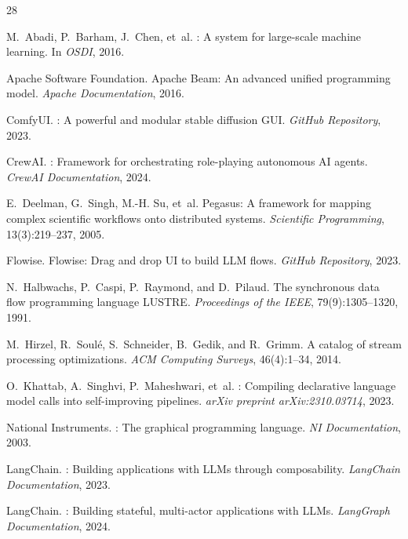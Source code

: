 \documentclass[11pt,twocolumn]{article}
\begin{document}

\begin{thebibliography}{28}

M.~Abadi, P.~Barham, J.~Chen, et~al.
: A system for large-scale machine learning.
\newblock In \emph{OSDI}, 2016.

Apache Software Foundation.
\newblock Apache {Beam}: An advanced unified programming model.
\newblock \emph{Apache Documentation}, 2016.

ComfyUI.
: A powerful and modular stable diffusion {GUI}.
\newblock \emph{GitHub Repository}, 2023.

CrewAI.
: Framework for orchestrating role-playing autonomous {AI} agents.
\newblock \emph{CrewAI Documentation}, 2024.

E.~Deelman, G.~Singh, M.-H. Su, et~al.
\newblock Pegasus: A framework for mapping complex scientific workflows onto distributed systems.
\newblock \emph{Scientific Programming}, 13(3):219--237, 2005.

Flowise.
\newblock Flowise: Drag and drop {UI} to build {LLM} flows.
\newblock \emph{GitHub Repository}, 2023.

N.~Halbwachs, P.~Caspi, P.~Raymond, and D.~Pilaud.
\newblock The synchronous data flow programming language {LUSTRE}.
\newblock \emph{Proceedings of the IEEE}, 79(9):1305--1320, 1991.

M.~Hirzel, R.~Soul\'e, S.~Schneider, B.~Gedik, and R.~Grimm.
\newblock A catalog of stream processing optimizations.
\newblock \emph{ACM Computing Surveys}, 46(4):1--34, 2014.

O.~Khattab, A.~Singhvi, P.~Maheshwari, et~al.
: Compiling declarative language model calls into self-improving pipelines.
\newblock \emph{arXiv preprint arXiv:2310.03714}, 2023.

National Instruments.
: The graphical programming language.
\newblock \emph{NI Documentation}, 2003.

LangChain.
: Building applications with {LLM}s through composability.
\newblock \emph{LangChain Documentation}, 2023.

LangChain.
: Building stateful, multi-actor applications with {LLM}s.
\newblock \emph{LangGraph Documentation}, 2024.


\end{thebibliography}
\end{document}
